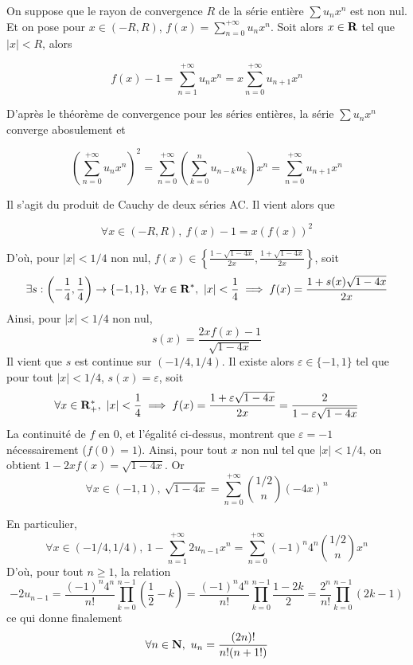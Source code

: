 \begin{correction}
On suppose que le rayon de convergence $R$ de la série entière $\sum u_nx^n$ est non nul.
Et on pose pour $x\in(-R,R)$, $f(x)=\sum_{n=0}^{+\infty}u_nx^n$. 
Soit alors $x\in\operatorname{\mathbf{R}}$ tel que $|x|<R$, alors 

\[f(x)-1=\sum_{n=1}^{+\infty}u_nx^n=x\sum_{n=0}^{+\infty}u_{n+1}x^n\]

D'après le théorème de convergence pour les séries entières, la série $\sum u_nx^n$ converge abosulement et 

\[\left(\sum_{n=0}^{+\infty}u_nx^n\right)^2=\sum_{n=0}^{+\infty}\left(\sum_{k=0}^nu_{n-k}u_k\right)x^n=\sum_{n=0}^{+\infty}u_{n+1}x^n\]

Il s'agit du produit de Cauchy de deux séries AC.
Il vient alors que

\[\forall x\in(-R,R),\ f(x)-1=x(f(x))^2\]

D'où, pour $|x|<1/4$ non nul, $f(x)\in\left\lbrace \frac{1-\sqrt{1-4x}}{2x},\frac{1+\sqrt{1-4x}}{2x}\right\rbrace$, soit \[\exists s:\left(-\frac14,\frac14\right)\to\lbrace-1,1\rbrace,\ \forall x\in\operatorname{\mathbf{R}}^*,\ |x|<\frac14\implies f(x)=\frac{1+s(x)\sqrt{1-4x}}{2x}\]
Ainsi, pour $|x|<1/4$ non nul, \[s(x)=\frac{2xf(x)-1}{\sqrt{1-4x}}\]
Il vient que $s$ est continue sur $\left(-1/4,1/4\right)$.
Il existe alors $\varepsilon\in\lbrace -1,1\rbrace$ tel que pour tout $|x|<1/4$, $s(x)=\varepsilon$, soit 
\[
    \forall x\in\Rpe,\ |x|<\frac14\implies f(x)=\frac{1+\varepsilon\sqrt{1-4x}}{2x}=\frac2{1-\varepsilon\sqrt{1-4x}}  
\]
La continuité de $f$ en $0$, et l'égalité ci-dessus, montrent que $\varepsilon=-1$ nécessairement ($f(0)=1$). 
Ainsi, pour tout $x$ non nul tel que $|x|<1/4$, on obtient $1-2xf(x)=\sqrt{1-4x}$. 
Or
\[
\forall x\in(-1,1),\ \sqrt{1-4x}=\sum_{n=0}^{+\infty}\binom{1/2}n(-4x)^n
\]

En particulier,
\[
    \forall x\in(-1/4,1/4),\ 1-\sum_{n=1}^{+\infty}2u_{n-1}x^n=\sum_{n=0}^{+\infty}(-1)^n4^n\binom{1/2}nx^n
\]
D'où, pour tout $n\geq 1$, la relation 
\[
    -2u_{n-1}=\frac{(-1)^n4^n}{n!}\prod_{k=0}^{n-1}\left(\frac12-k\right)=\frac{(-1)^n4^n}{n!}\prod_{k=0}^{n-1}\frac{1-2k}2=\frac{2^n}{n!}\prod_{k=0}^{n-1}(2k-1)    
\]
ce qui donne finalement 
\[
    \forall n\in\N,\ u_n=\frac{(2n)!}{n!(n+1!)}
\]
\end{correction}

